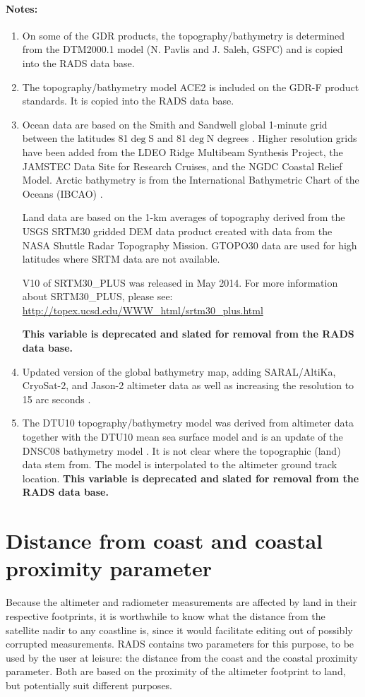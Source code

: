 \documentclass[a4paper,11pt,openany,natbib,nomargin]{thesis}
\newcommand\deprecated[1][This variable is]{\textbf{#1 deprecated and slated for removal from the RADS data base.}}
\newenvironment{notes}[1][Notes:]{\FloatBarrier\paragraph{#1}\begin{enumerate}}{\end{enumerate}}
\begin{document}
\begin{notes}
\item On some of the GDR products, the topography/bathymetry is determined from the DTM2000.1 model (N. Pavlis and J. Saleh, GSFC) and is copied into the RADS data base.\label{item:topo_dtm2000}
\item The topography/bathymetry model ACE2 is included on the GDR-F product standards. It is copied into the RADS data base.\label{item:topo_ace2}
\item
Ocean data are based on the Smith and Sandwell global 1-minute grid between the latitudes 81$\deg$S and 81$\deg$N degrees \citep{sandwell2014b}. Higher resolution grids have been added from the LDEO Ridge Multibeam Synthesis Project, the JAMSTEC Data Site for Research Cruises, and the NGDC Coastal Relief Model. Arctic bathymetry is from the International Bathymetric Chart of the Oceans (IBCAO) \citep{jakobsson2012}.

Land data are based on the 1-km averages of topography derived from the USGS SRTM30 gridded DEM data product created with data from the NASA Shuttle Radar Topography Mission. GTOPO30 data are used for high latitudes where SRTM data are not available.

V10 of SRTM30\_PLUS was released in May 2014.
For more information about SRTM30\_PLUS, please see:
\url{http://topex.ucsd.edu/WWW_html/srtm30_plus.html}

\deprecated\label{item:topo_srtm30plus}
\item Updated version of the global bathymetry map, adding SARAL/AltiKa, CryoSat-2, and Jason-2 altimeter data as well as increasing the resolution to 15 arc seconds \citep{tozer2019}.\label{item:topo_srtm15plus}  
\item The DTU10 topography/bathymetry model was derived from altimeter data together with the DTU10 mean sea surface model \citep{andersen2010} and is an update of the DNSC08 bathymetry model \citep{andersen2009a}. It is not clear where the topographic (land) data stem from. The model is interpolated to the altimeter ground track location. \deprecated\label{item:topo_dtu10}
\end{notes}

\section{Distance from coast and coastal proximity parameter}

Because the altimeter and radiometer measurements are affected by land in their respective footprints, it is worthwhile to know what the distance from the satellite nadir to any coastline is, since it would facilitate editing out of possibly corrupted measurements. RADS contains two parameters for this purpose, to be used by the user at leisure: the distance from the coast and the coastal proximity parameter. Both are based on the proximity of the altimeter footprint to land, but potentially suit different purposes.
\end{document}
